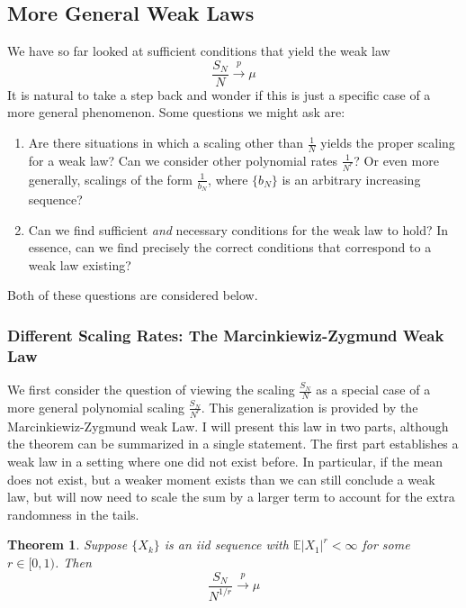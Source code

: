 \documentclass[12pt]{article}
\newcommand*{\abs}[1]{\left\lvert#1\right\rvert}
\newcommand{\E}{\mathbb{E}}
\newtheorem{thm}{Theorem}
\begin{document}
\subsection{More General Weak Laws}
We have so far looked at sufficient conditions that yield the weak law
\[\frac{S_N}{N} \overset{p}{\to} \mu\]
It is natural to take a step back and wonder if this is just a specific case of a more general phenomenon. Some questions we might ask are:
\begin{enumerate}
\item Are there situations in which a scaling other than $\frac{1}{N}$ yields the proper scaling for a weak law? Can we consider other polynomial rates $\frac{1}{N^r}$? Or even more generally, scalings of the 
form $\frac{1}{b_N}$, where $\{b_N\}$ is an arbitrary increasing sequence? 
\item Can we find sufficient \textit{and} necessary conditions for the weak law to hold? In essence, can we find precisely the correct conditions that correspond to a weak law existing? 
\end{enumerate}
Both of these questions are considered below. 

\subsubsection{Different Scaling Rates: The Marcinkiewiz-Zygmund Weak Law}
We first consider the question of viewing the scaling $\frac{S_N}{N}$ as a special case of a more general polynomial scaling $\frac{S_N}{N^r}$. This generalization is provided by the 
Marcinkiewiz-Zygmund weak Law. I will present this law in two parts, although the theorem can be summarized in a single statement. The first part establishes a weak law in a setting where 
one did not exist before. In particular, if the mean does not exist, but a weaker moment exists than we can still conclude a weak law, but will now need to scale the sum by a larger term to account 
for the extra randomness in the tails. 
\begin{thm} 
Suppose $\{X_k\}$ is an iid sequence with $\E\abs{X_1}^r < \infty$ for some $r \in [0, 1)$. Then 
\[\frac{S_N}{N^{1/r}} \overset{p}{\to} \mu\]
\end{thm}
\end{document}
